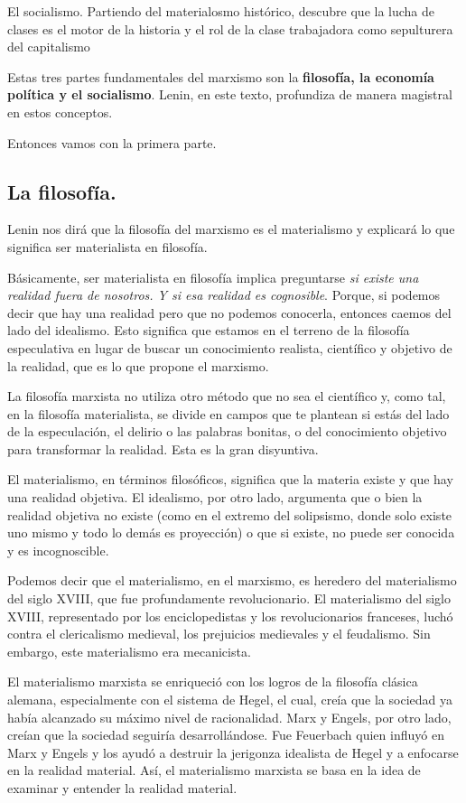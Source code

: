 \documentclass[
  jou,
  floatsintext,
  longtable,
  a4paper,
  nolmodern,
  notxfonts,
  notimes,
  colorlinks=true,linkcolor=blue,citecolor=blue,urlcolor=blue]{apa7}
\begin{document}
El socialismo. Partiendo del materialosmo histórico, descubre que la
lucha de clases es el motor de la historia y el rol de la clase
trabajadora como sepulturera del capitalismo

Estas tres partes fundamentales del marxismo son la \textbf{filosofía,
la economía política y el socialismo}. Lenin, en este texto, profundiza
de manera magistral en estos conceptos.

Entonces vamos con la primera parte.

\subsection{La filosofía.}\label{la-filosofuxeda.}

Lenin nos dirá que la filosofía del marxismo es el materialismo y
explicará lo que significa ser materialista en filosofía.

Básicamente, ser materialista en filosofía implica preguntarse \emph{si
existe una realidad fuera de nosotros. Y si esa realidad es cognosible}.
Porque, si podemos decir que hay una realidad pero que no podemos
conocerla, entonces caemos del lado del idealismo. Esto significa que
estamos en el terreno de la filosofía especulativa en lugar de buscar un
conocimiento realista, científico y objetivo de la realidad, que es lo
que propone el marxismo.

La filosofía marxista no utiliza otro método que no sea el científico y,
como tal, en la filosofía materialista, se divide en campos que te
plantean si estás del lado de la especulación, el delirio o las palabras
bonitas, o del conocimiento objetivo para transformar la realidad. Esta
es la gran disyuntiva.

El materialismo, en términos filosóficos, significa que la materia
existe y que hay una realidad objetiva. El idealismo, por otro lado,
argumenta que o bien la realidad objetiva no existe (como en el extremo
del solipsismo, donde solo existe uno mismo y todo lo demás es
proyección) o que si existe, no puede ser conocida y es incognoscible.

Podemos decir que el materialismo, en el marxismo, es heredero del
materialismo del siglo XVIII, que fue profundamente revolucionario. El
materialismo del siglo XVIII, representado por los enciclopedistas y los
revolucionarios franceses, luchó contra el clericalismo medieval, los
prejuicios medievales y el feudalismo. Sin embargo, este materialismo
era mecanicista.

El materialismo marxista se enriqueció con los logros de la filosofía
clásica alemana, especialmente con el sistema de Hegel, el cual, creía
que la sociedad ya había alcanzado su máximo nivel de racionalidad. Marx
y Engels, por otro lado, creían que la sociedad seguiría
desarrollándose. Fue Feuerbach quien influyó en Marx y Engels y los
ayudó a destruir la jerigonza idealista de Hegel y a enfocarse en la
realidad material. Así, el materialismo marxista se basa en la idea de
examinar y entender la realidad material.
\end{document}
